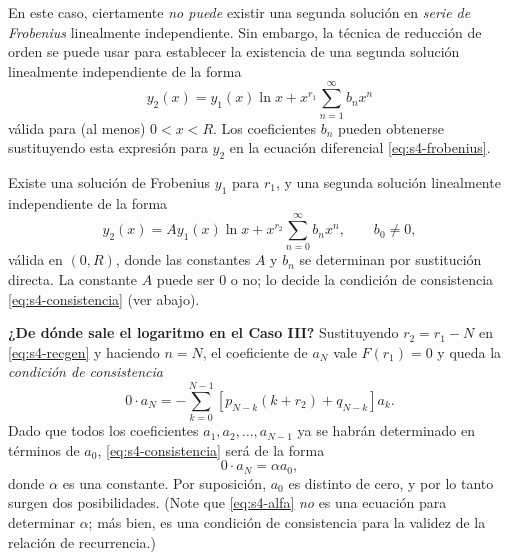 \begin{theorem}[Caso II: $r_1=r_2$]\label{thm:s4-II}
En este caso, ciertamente \textit{no puede} existir una segunda solución en \textit{serie de Frobenius} linealmente independiente. Sin embargo, la técnica de reducción de orden se puede usar para establecer la existencia de una segunda solución linealmente independiente de la forma
\[ y_2(x) = y_1(x) \ln x + x^{r_1} \sum_{n=1}^{\infty} b_n x^n \]
válida para (al menos) $0 < x < R$. Los coeficientes $b_n$ pueden obtenerse sustituyendo esta expresión para $y_2$ en la ecuación diferencial \eqref{eq:s4-frobenius}.
\end{theorem}
 
\begin{theorem}[Caso III: $r_1-r_2=N\in\mathbb N$]\label{thm:s4-III}
Existe una solución de Frobenius $y_1$ para $r_1$, y una segunda solución linealmente independiente de la forma
\[ y_2(x) = A y_1(x) \ln x + x^{r_2} \sum_{n=0}^{\infty} b_n x^n, \qquad b_0\ne0, \]
válida en $(0,R)$, donde las constantes $A$ y $b_n$ se determinan por sustitución directa. La constante $A$ puede ser $0$ o no; lo decide la condición de consistencia \eqref{eq:s4-consistencia} (ver abajo).
\end{theorem}
 
\textbf{¿De dónde sale el logaritmo en el Caso III?} Sustituyendo $r_2=r_1-N$ en \eqref{eq:s4-recgen} y haciendo $n=N$, el coeficiente de $a_N$ vale $F(r_1)=0$ y queda la \emph{condición de consistencia}
\begin{equation}
0 \cdot a_N = -\sum_{k=0}^{N-1} [p_{N-k}(k + r_2) + q_{N-k}] a_k.
\label{eq:s4-consistencia}
\end{equation}
Dado que todos los coeficientes $a_1, a_2, \dots, a_{N-1}$ ya se habrán determinado en términos de $a_0$, \eqref{eq:s4-consistencia} será de la forma
\begin{equation}
0 \cdot a_N = \alpha a_0,
\label{eq:s4-alfa}
\end{equation}
donde $\alpha$ es una constante. Por suposición, $a_0$ es distinto de cero, y por lo tanto surgen dos posibilidades. (Note que \eqref{eq:s4-alfa} \textit{no} es una ecuación para determinar $\alpha$; más bien, es una condición de consistencia para la validez de la relación de recurrencia.)
 
